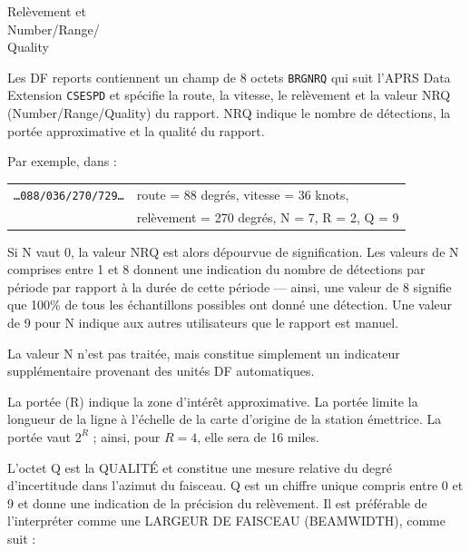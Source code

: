 \begin{aprssideblock}{Relèvement et\\Number/Range/\\Quality}
\label{bearing-number-range-quality-brgnrq}
Les DF reports contiennent un champ de 8 octets \lit{/}\texttt{BRG}\lit{/}\texttt{NRQ} qui
suit l'APRS Data Extension \texttt{CSE}\lit{/}\texttt{SPD} et spécifie la route, la
vitesse, le relèvement et la valeur NRQ (Number/Range/Quality) du
rapport. NRQ indique le nombre de détections, la portée approximative et
la qualité du rapport.

Par exemple, dans :

\begin{aprsexample}
\begin{tabular}{@{}l@{\hspace{1.2em}}l@{}}
\texttt{…088/036/270/729…} & route = 88 degrés, vitesse = 36 knots, \\
& relèvement = 270 degrés, N = 7, R = 2, Q = 9
\end{tabular}
\end{aprsexample}

Si N vaut 0, la valeur NRQ est alors dépourvue de signification. Les
valeurs de N comprises entre 1 et 8 donnent une indication du nombre de
détections par période par rapport à la durée de cette période --- ainsi,
une valeur de 8 signifie que 100\% de tous les échantillons possibles
ont donné une détection. Une valeur de 9 pour N indique aux autres
utilisateurs que le rapport est manuel.

La valeur N n'est pas traitée, mais constitue simplement un indicateur
supplémentaire provenant des unités DF automatiques.

La portée (R) indique la zone d'intérêt approximative. La portée limite
la longueur de la ligne à l'échelle de la carte d'origine de la station
émettrice. La portée vaut $2^{R}$ ; ainsi, pour $R=4$, elle sera de
16 miles.

L'octet Q est la QUALITÉ et constitue une mesure relative du degré
d'incertitude dans l'azimut du faisceau. Q est un chiffre unique compris
entre 0 et 9 et donne une indication de la précision du relèvement. Il
est préférable de l'interpréter comme une LARGEUR DE FAISCEAU
(BEAMWIDTH), comme suit :


\end{aprssideblock}
